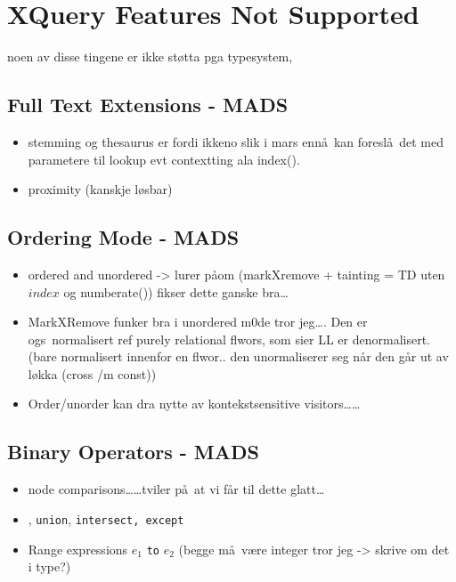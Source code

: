 \section{XQuery Features Not Supported}
\label{sect:disc:notSupported}
noen av disse tingene er ikke st\o tta pga typesystem, 

\subsection{Full Text Extensions  - {MADS}}
\begin{itemize}
	\item stemming og thesaurus er fordi ikkeno slik i mars enn\aa~kan foresl\aa~det med parametere til lookup evt
	contextting ala \textsf{index()}.
  	\item proximity (kanskje l\o sbar)
\end{itemize}


\subsection{Ordering Mode - {MADS}}
\begin{itemize}
  		\item ordered and unordered -> lurer p\aa om (markXremove + tainting = TD uten $index$ og
  		\textsf{numberate()}) fikser dette ganske bra\ldots
			\item MarkXRemove funker bra i unordered m0de tror jeg\ldots. Den er ogs\a~normalisert ref purely relational
			flwors, som sier LL er denormalisert. (bare normalisert innenfor en flwor.. den unormaliserer seg n\aa r den
			g\aa r ut av l\o kka (cross /m const))
			\item Order/unorder kan dra nytte av kontekstsensitive visitors\ldots\ldots 
\end{itemize}

\subsection{Binary Operators - {MADS}}
\begin{itemize}
  		\item node comparisons\ldots\ldots tviler p\aa~at vi f\aa r til dette glatt\ldots

  		\item \textbar, \texttt{union}, \texttt{intersect, except}
  		\item Range expressions $e_1$ \texttt{to} $e_2$ (begge m\aa~v\ae re integer tror jeg -> skrive om det i type?) 
\end{itemize}


